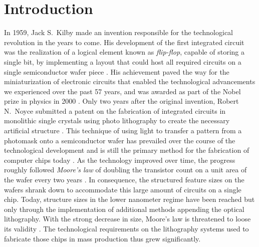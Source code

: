 \glsresetall
\chapter{Introduction} \label{ch:Intro}
In 1959, Jack S.~Kilby made an invention responsible for the technological revolution in the years to come. His development of the first integrated circuit was the realization of a logical element known as \emph{flip-flop}, capable of storing a single bit, by implementing a layout that could host all required circuits on a single semiconductor wafer piece  \cite{kilby_invention_1976}. His achievement paved the way for the miniaturization of electronic circuits that enabled the technological advancements we experienced over the past 57 years, and was awarded as part of the Nobel prize in physics in 2000 \cite{noauthor_press_nodate}. Only two years after the original invention, Robert N.~Noyce submitted a patent on the fabrication of integrated circuits in monolithic single crystals using photo lithography to create the necessary artificial structure \cite{noyce_semiconductor_1961}. This technique of using light to transfer a pattern from a photomask onto a semiconductor wafer has prevailed over the course of the technological development and is still the primary method for the fabrication of computer chips today \cite{mack_fundamental_2008}. As the technology improved over time, the progress roughly followed \emph{Moore's law} of doubling the transistor count on a unit area of the wafer every two years \cite{moore_cramming_1998}. In consequence, the structured feature sizes on the wafers shrank down to accommodate this large amount of circuits on a single chip. Today, structure sizes in the lower nanometer regime have been reached \cite{international_roadmap_committee_international_2015} but only through the implementation of additional methods appending the optical lithography. With the strong decrease in size, Moore's law is threatened to loose its validity \cite{mack_fifty_2011, schaller_moores_1997}. The technological requirements on the lithography systems used to fabricate those chips in mass production thus grew significantly.


